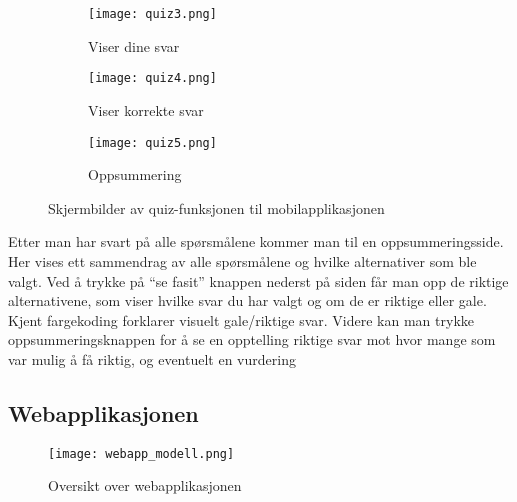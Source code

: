 \documentclass[../main.tex]{subfiles}
\begin{document}
\begin{figure}[H]
        \centering
        \begin{subfigure}[b]{0.3\textwidth}
                \centering
                \texttt{[image: quiz3.png]}
                \caption{Viser dine svar}
        \end{subfigure}
        \quad
        \begin{subfigure}[b]{0.3\textwidth}
                \centering
                \texttt{[image: quiz4.png]}
                \caption{Viser korrekte svar}
        \end{subfigure}
        \quad
                \begin{subfigure}[b]{0.3\textwidth}
                        \centering
                        \texttt{[image: quiz5.png]}
                        \caption{Oppsummering}
                \end{subfigure}
        \caption{Skjermbilder av quiz-funksjonen til mobilapplikasjonen}
\end{figure}

Etter man har svart på alle spørsmålene kommer man til en oppsummeringsside. Her vises ett sammendrag av alle spørsmålene og hvilke alternativer som ble valgt. Ved å trykke på “se fasit” knappen nederst på siden får man opp de riktige alternativene, som viser hvilke svar du har valgt og om de er riktige eller gale. Kjent fargekoding forklarer visuelt gale/riktige svar.
Videre kan man trykke oppsummeringsknappen for å se en opptelling riktige svar mot hvor mange som var mulig å få riktig, og eventuelt en vurdering






\subsection{Webapplikasjonen}

\begin{figure}[H]
  \centering
  \texttt{[image: webapp\_modell.png]}
  \caption{Oversikt over webapplikasjonen}
\end{figure}
\end{document}
